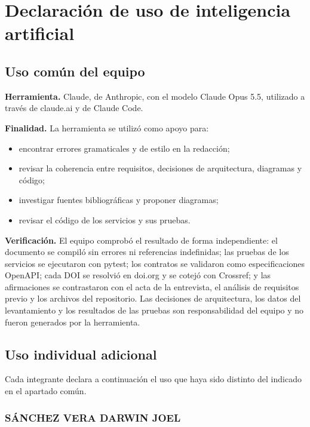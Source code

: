 \section{Declaración de uso de inteligencia artificial}
\label{sec:declaracion-ia}

\subsection{Uso común del equipo}
\textbf{Herramienta.} Claude, de Anthropic, con el modelo Claude Opus 5.5, utilizado a través de claude.ai y de Claude Code.

\textbf{Finalidad.} La herramienta se utilizó como apoyo para:
\begin{itemize}
  \item encontrar errores gramaticales y de estilo en la redacción;
  \item revisar la coherencia entre requisitos, decisiones de arquitectura, diagramas y código;
  \item investigar fuentes bibliográficas y proponer diagramas;
  \item revisar el código de los servicios y sus pruebas.
\end{itemize}

\textbf{Verificación.} El equipo comprobó el resultado de forma independiente: el documento se compiló sin errores ni referencias indefinidas; las pruebas de los servicios se ejecutaron con pytest; los contratos se validaron como especificaciones OpenAPI; cada DOI se resolvió en doi.org y se cotejó con Crossref; y las afirmaciones se contrastaron con el acta de la entrevista, el análisis de requisitos previo y los archivos del repositorio. Las decisiones de arquitectura, los datos del levantamiento y los resultados de las pruebas son responsabilidad del equipo y no fueron generados por la herramienta.

\subsection{Uso individual adicional}
Cada integrante declara a continuación el uso que haya sido distinto del indicado en el apartado común.

\subsubsection*{SÁNCHEZ VERA DARWIN JOEL}
\vspace{2cm}


